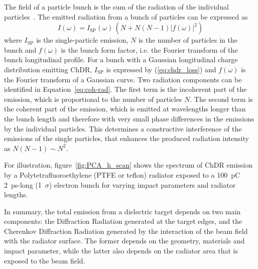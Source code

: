 The field of a particle bunch is the sum of the radiation of the individual particles~\cite{MOTZ}. The emitted radiation from a bunch of particles can be expressed as \cite{tesla_report}
\begin{equation}
I(\omega) = I_\text{SP}  \left(\omega\right) \,
\left( N + N \left( N -1 \right) \left| f \left(\omega\right) \right|^2 \right) \label{eq:coh-rad} 
\end{equation}
where $I_\text{SP}$ is the single-particle emission, $N$ is the number of particles in the bunch and $f(\omega)$ is the bunch form factor, i.e. the Fourier transform of the bunch longitudinal profile. For a bunch with a Gaussian longitudinal charge distribution emitting ChDR, $I_\text{SP}$ is expressed by (\ref{eq:chdr_loss}) and $f\left(\omega\right)$ is the Fourier transform of a Gaussian curve. Two radiation components can be identified in Equation~\ref{eq:coh-rad}. The first term is the incoherent part of the emission, which is proportional to the number of particles $N$. The second term is the coherent part of the emission, which is emitted at wavelengths longer than the bunch length and therefore with very small phase differences in the emissions by the individual particles. This determines a constructive interference of the emissions of the single particles, that enhances the produced radiation intensity as $N\left( N -1\right) \sim N^2$.

For illustration, figure~\ref{fig:PCA_h_scan} shows the spectrum of ChDR emission by a Polytetrafluoroethylene (PTFE or teflon)  radiator exposed to a 100~pC 2~ps-long (1~$\sigma$) electron bunch for varying impact parameters and radiator lengths.

In summary, the total emission from a dielectric target depends on two main components: the Diffraction Radiation generated at the target edges, and the Cherenkov Diffraction Radiation generated by the interaction of the beam field with the radiator surface. The former depends on the geometry, materials and impact parameter, while the latter also depends on the radiator area that is exposed to the beam field. 



